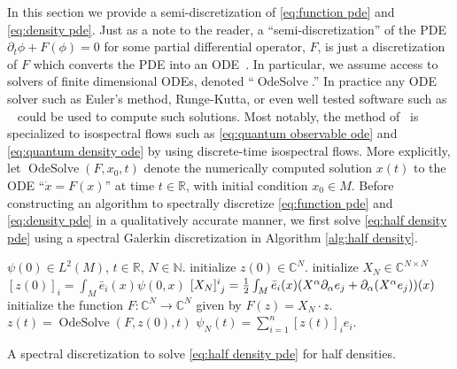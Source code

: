 \documentclass[final,leqno]{siamart}
\DeclareMathOperator{\OdeSolve}{OdeSolve}
\begin{document}
In this section we provide a semi-discretization of \eqref{eq:function pde} and \eqref{eq:density pde}.
Just as a note to the reader, a ``semi-discretization''  of the PDE $\partial_{t} \phi + F(\phi) = 0$ for some partial differential operator, $F$, is just a discretization of $F$ which 
converts the PDE into an ODE~\cite{Gottlieb1977numerical}.
In particular, we assume access to solvers of finite dimensional ODEs, denoted ``$\OdeSolve$.''
In practice any ODE solver such as Euler's method, Runge-Kutta, or even well tested software such as ~\cite{VODE} could be used to compute such solutions.
Most notably, the method of~\cite{Calvo1997} is specialized to isospectral flows such as  \eqref{eq:quantum observable ode} and \eqref{eq:quantum density ode} by using discrete-time isospectral flows.
More explicitly, let $\OdeSolve ( F , x_{0} , t )$ denote the numerically computed solution $x(t)$ to the ODE ``$\dot{x} = F(x)$'' at time $t \in \mathbb{R}$, with initial condition $x_{0} \in M$.
Before constructing an algorithm to spectrally discretize \eqref{eq:function pde} and \eqref{eq:density pde} in a qualitatively accurate manner, we first solve \eqref{eq:half density pde} using a spectral Galerkin discretization in Algorithm \ref{alg:half density}.

\begin{algorithm}
\begin{algorithmic}
	\REQUIRE $\psi(0) \in L^{2}(M)$, $t \in \mathbb{R}$, $N \in \mathbb{N}$.
	\STATE initialize $z(0) \in \mathbb{C}^{N}$.
	\STATE initialize $X_{N} \in \mathbb{C}^{N \times N}$
		\STATE $[z(0)]_{i} = \int_{M} \bar{e}_{i}(x) \psi(0,x)$
			\STATE $[X_{N}]\indices{^{i}_{j}} = \frac{1}{2} \int_{M} \bar{e}_{i}(x) ( X^{\alpha} \partial_{\alpha} e_{j} + \partial_{\alpha}( X^{\alpha} e_{j}) )(x)$
		\ENDFOR
	\ENDFOR
	\STATE initialize the function $F: \mathbb{C}^{N} \to \mathbb{C}^{N}$ given by $F(z) = X_{N} \cdot z$.
	\STATE $z(t) = \operatorname{OdeSolve}(  F , z(0) , t)$
	\RETURN  $\psi_{N}(t) = \sum_{i=1}^{n} [z(t)]_{i} e_{i}$.
\end{algorithmic}
\caption{A spectral discretization to solve \eqref{eq:half density pde} for half densities.} \label{alg:half density}
\end{algorithm}
\end{document}
